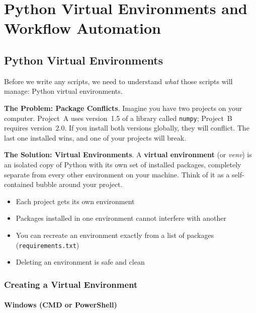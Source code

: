 \chapter{Python Virtual Environments and Workflow Automation}
\label{ch:python-environments}

\section{Python Virtual Environments}
\label{sec:venvs}

Before we write any scripts, we need to understand \emph{what} those scripts
will manage: Python virtual environments.

\textbf{The Problem: Package Conflicts}.
Imagine you have two projects on your computer. Project~A uses version~1.5
of a library called \texttt{numpy}; Project~B requires version~2.0. If you
install both versions globally, they will conflict. The last one installed
wins, and one of your projects will break.

\textbf{The Solution: Virtual Environments}.
A \textbf{virtual environment} (or \emph{venv}) is an isolated copy of
Python with its own set of installed packages, completely separate from
every other environment on your machine. Think of it as a self-contained
bubble around your project.

\begin{itemize}
  \item Each project gets its own environment
  \item Packages installed in one environment cannot interfere with another
  \item You can recreate an environment exactly from a list of packages
        (\texttt{requirements.txt})
  \item Deleting an environment is safe and clean
\end{itemize}

\subsection{Creating a Virtual Environment}

\subsubsection{Windows (CMD or PowerShell)}

